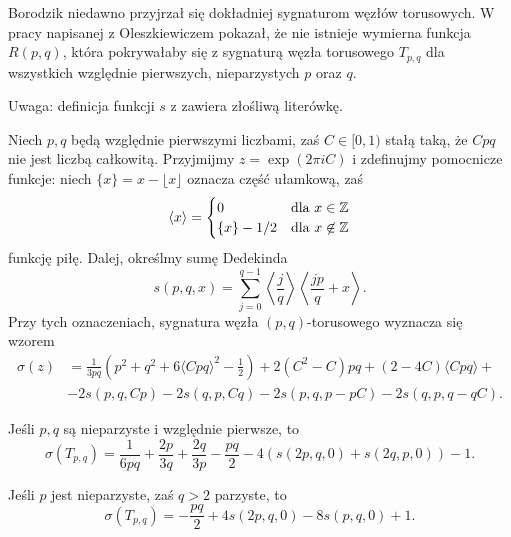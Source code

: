 Borodzik niedawno przyjrzał się dokładniej sygnaturom węzłów torusowych.
%
W pracy \cite{borodzik10} napisanej z Oleszkiewiczem pokazał, że nie istnieje wymierna funkcja $R(p, q)$, która pokrywałaby się z sygnaturą węzła torusowego $T_{p, q}$ dla wszystkich względnie pierwszych, nieparzystych $p$ oraz $q$.
%

Uwaga: definicja funkcji $s$ z \cite{borodzik10} zawiera złośliwą literówkę.

\begin{proposition}
    Niech $p, q$ będą względnie pierwszymi liczbami, zaś $C \in [0, 1)$ stałą taką, że $Cpq$ nie jest liczbą całkowitą.
    Przyjmijmy $z = \exp (2 \pi i C)$ i zdefinujmy pomocnicze funkcje: niech $\{x\} = x - \lfloor x \rfloor$ oznacza część ułamkową, zaś
    \begin{equation}
        \langle x \rangle = \begin{cases}
            0 & \text{dla } x \in \mathbb Z \\
            \{x\} - 1/2 & \text{dla } x \not \in \mathbb Z
        \end{cases}
    \end{equation}
    funkcję piłę.
    Dalej, określmy sumę Dedekinda
    \begin{equation}
        s(p, q, x) = \sum_{j = 0}^{q-1} \left\langle \frac {j}{q} \right\rangle \left\langle \frac {jp}{q} + x \right\rangle.
    \end{equation}
    Przy tych oznaczeniach, sygnatura węzła $(p, q)$-torusowego wyznacza się wzorem
    \begin{align}
        \sigma(z) & = \frac{1}{3pq} \left (p^2 + q^2 + 6 \langle Cpq \rangle^2 - \frac {1}{2} \right)  + 2(C^2 - C) pq + (2-4C) \langle Cpq \rangle + {} \\
        & - 2s(p, q, Cp) - 2s(q, p, Cq) - 2s(p, q, p-pC) - 2s(q, p, q-qC). \nonumber
    \end{align}
\end{proposition}

\begin{corollary}
    Jeśli $p, q$ są nieparzyste i względnie pierwsze, to
    \begin{equation}
        \sigma(T_{p,q}) = \frac{1}{6pq} + \frac{2p}{3q} + \frac{2q}{3p} - \frac{pq}{2} - 4(s(2p, q, 0) + s(2q, p, 0)) - 1.
    \end{equation}
\end{corollary}

\begin{corollary}
    Jeśli $p$ jest nieparzyste, zaś $q > 2$ parzyste, to
    \begin{equation}
        \sigma(T_{p,q}) = - \frac{pq}{2} + 4s(2p, q, 0) - 8s(p, q, 0) + 1.
    \end{equation}
\end{corollary}

